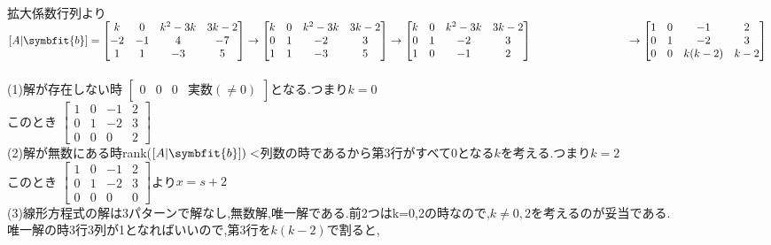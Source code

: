\noindent
{}\\
拡大係数行列より\\
$[A|\symbfit{b}]=
\begin{bmatrix}
    k & 0 & k^2-3k & 3k-2 \\
    -2 & -1 & 4 & -7 \\
    1 & 1& -3 & 5
\end{bmatrix}\rightarrow
\begin{bmatrix}
    k & 0 & k^2-3k & 3k-2 \\
    0 & 1 & -2 & 3 \\
    1 & 1 & -3 & 5
\end{bmatrix}\rightarrow
\begin{bmatrix}
    k & 0 & k^2-3k & 3k-2 \\
    0 & 1 & -2 & 3 \\
    1 & 0 & -1 & 2
\end{bmatrix}\\ \hspace{3cm}\rightarrow
\begin{bmatrix}
    1 & 0 & -1 & 2 \\
    0 & 1 & -2 & 3 \\
    0 & 0 & k(k-2) & k-2
\end{bmatrix}$\\\\
(1)解が存在しない時
$\begin{bmatrix}
    0 & 0 & 0 & \text{実数}(\neq 0)
\end{bmatrix}$となる.つまり$k=0$\\
このとき
$\begin{bmatrix}
    1 & 0 & -1 & 2 \\
    0 & 1 & -2 & 3 \\
    0 & 0 & 0 & 2
\end{bmatrix}$\\
(2)解が無数にある時rank($[A|\symbfit{b}]) < $列数の時であるから第3行がすべて0となる$k$を考える.つまり$k=2$\\
このとき
$\begin{bmatrix}
    1 & 0 & -1 & 2 \\
    0 & 1 & -2 & 3 \\
    0 & 0 & 0 & 0
\end{bmatrix}$より$x=s+2$\\
(3)線形方程式の解は3パターンで解なし,無数解,唯一解である.前2つはk=0,2の時なので,$k \neq 0,2$を考えるのが妥当である.\\
唯一解の時3行3列が1となればいいので,第3行を$k(k-2)$で割ると,
